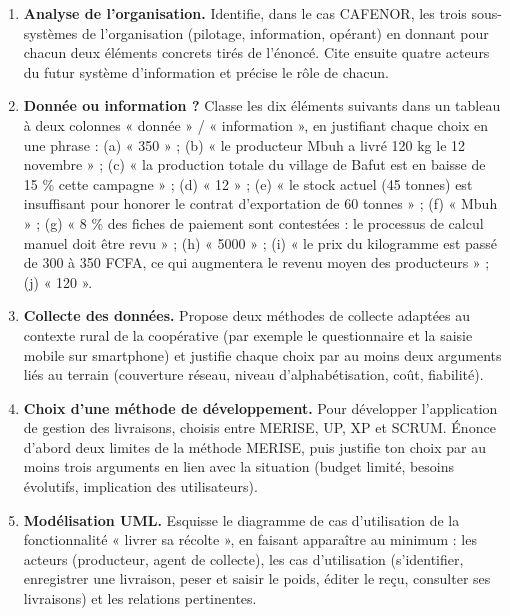 \documentclass[11pt]{article}
\newcounter{popsec}
\newcounter{popsub}
\newcommand{\courssub}[1]{%
  \stepcounter{popsub}%
  \par\vspace{9pt}\noindent{\popxbold\fontsize{11.5}{13}\selectfont\color{popink}{\color{poporange}\thepopsec.\thepopsub}\hspace{6pt}#1}\par\nopagebreak\vspace{4pt}
}
\begin{document}
\begin{enumerate}
\item \textbf{Analyse de l'organisation.} Identifie, dans le cas CAFENOR, les trois sous-systèmes de l'organisation (pilotage, information, opérant) en donnant pour chacun deux éléments concrets tirés de l'énoncé. Cite ensuite quatre acteurs du futur système d'information et précise le rôle de chacun.
\item \textbf{Donnée ou information ?} Classe les dix éléments suivants dans un tableau à deux colonnes « donnée » / « information », en justifiant chaque choix en une phrase : (a) « 350 » ; (b) « le producteur Mbuh a livré 120 kg le 12 novembre » ; (c) « la production totale du village de Bafut est en baisse de 15 \% cette campagne » ; (d) « 12 » ; (e) « le stock actuel (45 tonnes) est insuffisant pour honorer le contrat d'exportation de 60 tonnes » ; (f) « Mbuh » ; (g) « 8 \% des fiches de paiement sont contestées : le processus de calcul manuel doit être revu » ; (h) « 5000 » ; (i) « le prix du kilogramme est passé de 300 à 350 FCFA, ce qui augmentera le revenu moyen des producteurs » ; (j) « 120 ».
\item \textbf{Collecte des données.} Propose deux méthodes de collecte adaptées au contexte rural de la coopérative (par exemple le questionnaire et la saisie mobile sur smartphone) et justifie chaque choix par au moins deux arguments liés au terrain (couverture réseau, niveau d'alphabétisation, coût, fiabilité).
\item \textbf{Choix d'une méthode de développement.} Pour développer l'application de gestion des livraisons, choisis entre MERISE, UP, XP et SCRUM. Énonce d'abord deux limites de la méthode MERISE, puis justifie ton choix par au moins trois arguments en lien avec la situation (budget limité, besoins évolutifs, implication des utilisateurs).
\item \textbf{Modélisation UML.} Esquisse le diagramme de cas d'utilisation de la fonctionnalité « livrer sa récolte », en faisant apparaître au minimum : les acteurs (producteur, agent de collecte), les cas d'utilisation (s'identifier, enregistrer une livraison, peser et saisir le poids, éditer le reçu, consulter ses livraisons) et les relations pertinentes.
\end{enumerate}

\courssub{Ressources à mobiliser}
\end{document}
